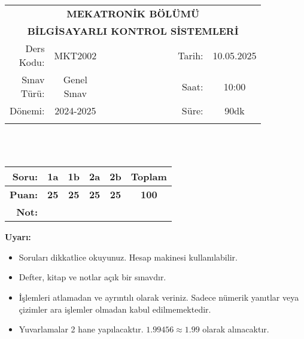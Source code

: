 \newcommand\UniversiteAdi{Niğde Ömer Halisdemir Üniversitesi}
\newcommand\BolumAdi{MEKATRONİK BÖLÜMÜ}
\newcommand\DersKodu{MKT2002}
\newcommand\DersAdi{BİLGİSAYARLI KONTROL SİSTEMLERİ}
\newcommand\SinavAdi{Genel Sınav}
\newcommand\SinavTarihi{10.05.2025}
\newcommand\SinavSaati{10:00}
\newcommand\SinavSuresi{90dk}

\pagestyle{fancy}
\fancyhf{} %
\noindent
\begin{tabular}{
    p{0.15\linewidth}
    p{0.15\linewidth}
    p{0.3\linewidth}
    p{0.1\linewidth}
    p{0.15\linewidth}}
    \multicolumn{5}{c}{\textbf{\BolumAdi}}\\
    \multicolumn{5}{c}{\textbf{\DersAdi}}\\\hline
    \multicolumn{1}{|r|}{Ders Kodu:}&
    \multicolumn{1}{|c|}{\DersKodu}&
    \multicolumn{1}{|c|}{}& 
    \multicolumn{1}{|r|}{Tarih:}&
    \multicolumn{1}{|c|}{\SinavTarihi} \\\hline
    \multicolumn{1}{|r|}{Sınav Türü:}&
    \multicolumn{1}{|c|}{\SinavAdi}&  
    \multicolumn{1}{|c|}{}&
    \multicolumn{1}{|r|}{Saat:}&
    \multicolumn{1}{|c|}{\SinavSaati}\\\hline
    \multicolumn{1}{|r|}{Dönemi:}&
    \multicolumn{1}{|c|}{2024-2025}&
    \multicolumn{1}{|c|}{}&
    \multicolumn{1}{|r|}{Süre:}&
    \multicolumn{1}{|c|}{\SinavSuresi} \\\hline
    &&&&\\
\end{tabular}\\\\
\noindent\begin{center}
\begin{tabular}{|r|c|c|c|c|c|}\hline
    \textbf{Soru:}&
    \textbf{1a}&
    \textbf{1b}&
    \textbf{2a}&
    \textbf{2b}&
    \textbf{Toplam}\\\hline
    \textbf{Puan:}&
    \textbf{25}&
    \textbf{25}&
    \textbf{25}&
    \textbf{25}&
    \textbf{100}\\\hline
    \textbf{Not:}&&&&&\\\hline
\end{tabular}\end{center}
\noindent\textbf{Uyarı:}
\begin{itemize}\bfseries
    \item Soruları dikkatlice okuyunuz. Hesap makinesi kullanılabilir.
    \item Defter, kitap ve notlar açık bir sınavdır.
    \item İşlemleri atlamadan ve ayrıntılı olarak veriniz. Sadece nümerik yanıtlar veya çizimler ara işlemler olmadan kabul edilmemektedir.
    \item Yuvarlamalar 2 hane yapılacaktır. $\mathbf{1.99456\approx1.99}$ olarak alınacaktır.
\end{itemize}

